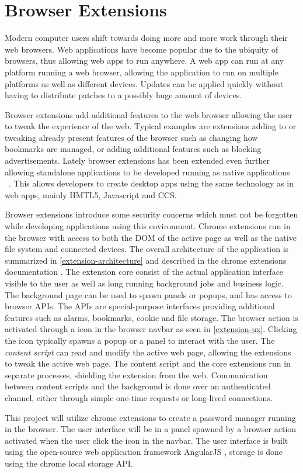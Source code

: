 \section{Browser Extensions}
Modern computer users shift towards doing more and more work through their web browsers. Web applications have become popular due to the ubiquity of browsers, thus allowing web apps to run anywhere. A web app can run at any platform running a web browser, allowing the application to run on multiple platforms as well as different devices. Updates can be applied quickly without having to distribute patches to a possibly huge amount of devices.
\par Browser extensions add additional features to the web browser allowing the user to tweak the experience of the web. Typical examples are extensions adding to or tweaking already present features of the browser such as changing how bookmarks are managed, or adding additional features such as blocking advertisements. Lately browser extensions has been extended even further allowing standalone applications to be developed running as native applications ~\cite{chrome-app-blog}. This allows developers to create desktop apps using the same technology as in web apps, mainly HMTL5, Javascript and CCS.
\par Browser extensions introduce some security concerns which must not be forgotten while developing applications using this environment. Chrome extensions run in the browser with access to both the DOM of the active page as well as the native file system and connected devices. The overall architecture of the application is summarized in \autoref{extension-architecture} and described in the chrome extensions documentation \cite{chrome-extensions}. The extension core consist of the actual application interface visible to the user as well as long running background jobs and business logic. The background page can be used to spawn panels or popups, and has access to browser APIs. The APIs are special-purpose interfaces providing additional features such as alarms, bookmarks, cookie and file storage. The browser action is activated through a icon in the browser navbar as seen in \autoref{extension-ux}. Clicking the icon typically spawns a popup or a panel to interact with the user. The \emph{content script} can read and modify the active web page, allowing the extensions to tweak the active web page. The content script and the core extensions run in separate processes, shielding the extension from the web. Communication between content scripts and the background is done over an authenticated channel, either through simple one-time requests or long-lived connections.
\par This project will utilize chrome extensions to create a password manager running in the browser. The user interface will be in a panel spawned by a browser action activated when the user click the icon in the navbar. The user interface is built using the open-source web application framework AngularJS \cite{angularjs}, storage is done using the chrome local storage API.

